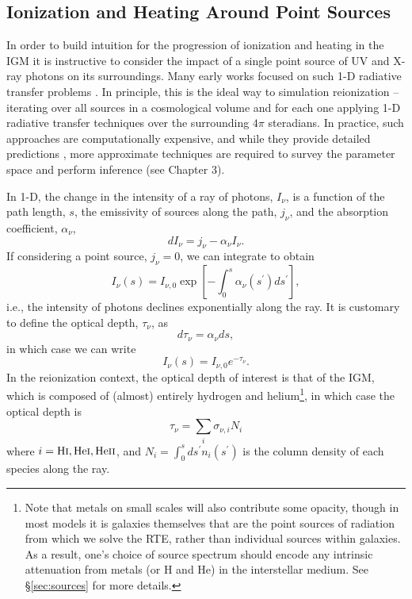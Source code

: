 \subsection{Ionization and Heating Around Point Sources} \label{sec:smallscales}
In order to build intuition for the progression of ionization and heating in the IGM it is instructive to consider the impact of a single point source of UV and X-ray photons on its surroundings. Many early works focused on such 1-D radiative transfer problems \cite{Iliev2006,Thomas2008}. In principle, this is the ideal way to simulation reionization -- iterating over all sources in a cosmological volume and for each one applying 1-D radiative transfer techniques over the surrounding $4\pi$ steradians. In practice, such approaches are computationally expensive, and while they provide detailed predictions \cite{OShea2015,Ocvirk2016,Gnedin2014}, more approximate techniques are required to survey the parameter space and perform inference (see Chapter 3).

In 1-D, the change in the intensity of a ray of photons, $I_{\nu}$, is a function of the path length, $s$, the emissivity of sources along the path, $j_{\nu}$, and the absorption coefficient, $\alpha_{\nu}$, 
\begin{equation}
	dI_{\nu} = j_{\nu} - \alpha_{\nu} I_{\nu} .
\end{equation}
If considering a point source, $j_{\nu} = 0$, we can integrate to obtain
\begin{equation}
	I_{\nu}(s) = I_{\nu,0} \exp\left[-\int_0^s \alpha_{\nu}(s^{\prime}) ds^{\prime} \right] ,
\end{equation}
i.e., the intensity of photons declines exponentially along the ray. It is customary to define the optical depth, $\tau_{\nu}$, as
\begin{equation}
	d\tau_{\nu} = \alpha_{\nu} ds ,
\end{equation}
in which case we can write
\begin{equation}
	I_{\nu}(s) = I_{\nu,0} e^{-\tau_{\nu}} .
\end{equation}
In the reionization context, the optical depth of interest is that of the IGM, which is composed of (almost) entirely hydrogen and helium\footnote{Note that metals on small scales will also contribute some opacity, though in most models it is galaxies themselves that are the point sources of radiation from which we solve the RTE, rather than individual sources within galaxies. As a result,  one's choice of source spectrum should encode any intrinsic attenuation from metals (or H and He) in the interstellar medium. See \S\ref{sec:sources} for more details.}, in which case the optical depth is 
\begin{equation}
	\tau_{\nu} = \sum_i \sigma_{\nu,i} N_i
\end{equation}
where $i=\text{H} {\textsc{i}},\text{He} {\textsc{i}},\text{He} {\textsc{ii}}$, and $N_i = \int_0^s ds^{\prime} n_i(s^{\prime})$ is the column density of each species along the ray.

